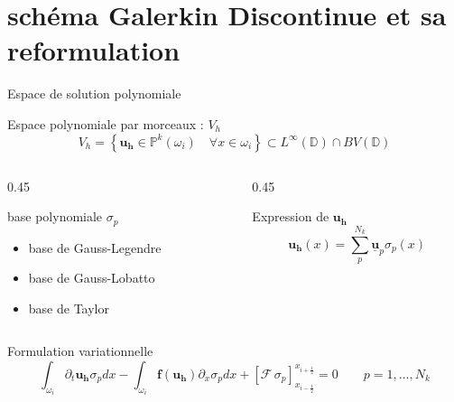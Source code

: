 \section{schéma Galerkin Discontinue et sa reformulation}

\begin{frame}{Espace de solution polynomiale }
\begin{block}{Espace polynomiale par morceaux : $V_h$}
\begin{equation}
    V_h = \left\{ \mathbf{u_h} \in \mathbb{P}^k(\omega_i) \quad \forall x\in \omega_i \right\} \subset L^\infty(\mathbb{D})\cap BV(\mathbb{D})
\end{equation}
\end{block}

\begin{columns}
\begin{column}{0.45\textwidth}
\begin{block}{base polynomiale $\sigma_p$}
    \begin{itemize}
        \item base de Gauss-Legendre
        \item base de Gauss-Lobatto
        \item base de Taylor
    \end{itemize}
\end{block}
\end{column}

\begin{column}{0.45\textwidth}
\begin{block}{Expression de $\mathbf{u_h}$ }
\begin{equation}
    \mathbf{u_h}(x) = \sum_p^{N_k} \underline{\mathbf{u}}_p \sigma_p(x)
\end{equation}
\end{block}
\end{column}
\end{columns}

\begin{block}{Formulation variationnelle}
\begin{equation}\label{Formulation_Variationnelle}
    \int_{\omega_i} \partial_t \mathbf{u_h} \sigma_p dx - \int_{\omega_i} \mathbf{f}(\mathbf{u_h}) \partial_x \sigma_p dx + \left[\mathcal{F} \,\sigma_p \right]_{x_{i-\frac{1}{2}}}^{x_{i+\frac{1}{2}}} = 0 \qquad p=1,\dots,N_k 
\end{equation}
\end{block}
\end{frame}

